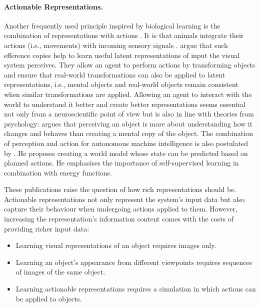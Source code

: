\paragraph{Actionable Representations.} Another frequently used principle inspired by biological learning is the combination of representations with actions . It is that animals integrate their actions (i.e., movements) with incoming sensory signals .
 argue that such efference copies help to learn useful latent representations of input the visual system perceives. They allow an agent to perform actions by transforming objects and ensure that real-world transformations can also be applied to latent representations, i.e., mental objects and real-world objects remain consistent when similar transformations are applied.
Allowing an agent to interact with the world to understand it better and create better representations seems essential not only from a neuroscientific point of view but is also in line with theories from psychology:
 argues that perceiving an object is more about understanding how it changes and behaves than creating a mental copy of the object.
The combination of perception and action for autonomous machine intelligence is also postulated by . He proposes creating a world model whose state can be predicted based on planned actions. He emphasises the importance of self-supervised learning in combination with energy functions.

These publications raise the question of how rich representations should be. Actionable representations not only represent the system's input data but also capture their behaviour when undergoing actions applied to them. However, increasing the representation's information content comes with the costs of providing richer input data:
\begin{itemize}
    \item Learning visual representations of an object requires images only.
    \item Learning an object's appearance from different viewpoints requires sequences of images of the same object.
    \item Learning actionable representations requires a simulation in which actions can be applied to objects. 
\end{itemize}

